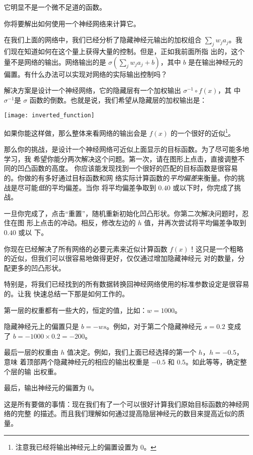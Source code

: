 它明显不是一个微不足道的函数。

你将要解出如何使用一个神经网络来计算它。

在我们上面的网络中，我们已经分析了隐藏神经元输出的加权组合
$\sum_j w_j a_j$。我们现在知道如何在这个量上获得大量的控制。但是，正如我前面所指
出的，这个量不是网络的输出。网络输出的是 $\sigma(\sum_j w_j a_j + b)$，其中 $b$
是在输出神经元的偏置。有什么办法可以实现对网络的实际输出控制吗？

解决方案是设计一个神经网络，它的隐藏层有一个加权输出 $\sigma^{-1} \circ f(x)$，其
中 $\sigma^{-1}$是 $\sigma$ 函数的倒数。也就是说，我们希望从隐藏层的加权输出是：
\begin{center}
  \texttt{[image: inverted\_function]}
\end{center}

如果你能这样做，那么整体来看网络的输出会是 $f(x)$ 的一个很好的近似\footnote{
  注意我已经将输出神经元上的偏置设置为 $0$。}。

那么你的挑战，是设计一个神经网络可近似上面显示的目标函数。为了尽可能多地学习，我
希望你能分两次解决这个问题。第一次，请在图形上点击，直接调整不同的凹凸函数的高度。
你应该能发现找到一个很好的匹配的目标函数是很容易的。你做的有多好通过目标函数和网
络实际计算函数的\emph{平均偏差}来衡量。你的挑战是尽可能\emph{低}的平均偏差。当你
将平均偏差争取到 $0.40$ 或以下时，你完成了挑战。

一旦你完成了，点击“重置”，随机重新初始化凹凸形状。你第二次解决问题时，忍住在图
形上点击的冲动。相反，修改左边的 $h$ 值，并再次尝试将平均偏差争取到 $0.40$ 或以
下。


你现在已经解决了所有网络的必要元素来近似计算函数
$f(x)$！这只是一个粗略的近似，但我们可以很容易地做得更好，仅仅通过增加隐藏神经元
对的数量，分配更多的凹凸形状。

特别是，将我们已经找到的所有数据转换回神经网络使用的标准参数设定是很容易的。让我
快速总结一下那是如何工作的。

第一层的权重都有一些大的，恒定的值，比如：$w = 1000$。

隐藏神经元上的偏置只是 $b = -w s$。例如，对于第二个隐藏神经元 $s = 0.2$ 变成
了 $b = -1000 \times 0.2 = -200$。

最后一层的权重由 $h$ 值决定。例如，我们上面已经选择的第一个 $h$，$h = -0.5$，意味
着顶部两个隐藏神经元的相应的输出权重是 $-0.5$ 和 $0.5$。如此等等，确定整个层的输
出权重。

最后，输出神经元的偏置为 $0$。

这是所有要做的事情：现在我们有了一个可以很好计算我们原始目标函数的神经网络的完整
的描述。而且我们理解如何通过提高隐层神经元的数目来提高近似的质量。

